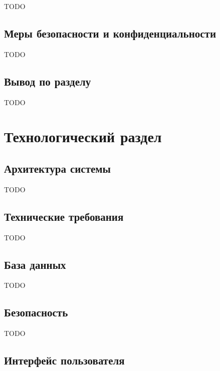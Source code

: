 \documentclass{mirea}
\begin{document}
TODO

\subsection{Меры безопасности и конфиденциальности}

TODO

\subsection*{Вывод по разделу}

TODO

\section{Технологический раздел}

\subsection{Архитектура системы}

TODO

\subsection{Технические требования}

TODO

\subsection{База данных}

TODO

\subsection{Безопасность}

TODO

\subsection{Интерфейс пользователя}
\end{document}
